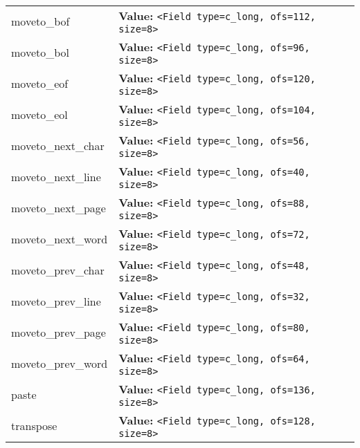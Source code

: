 \begin{longtable}{|p{\varnamewidth}|p{\vardescrwidth}|l}
\cline{1-2}
\raggedright m\-o\-v\-e\-t\-o\-\_\-b\-o\-f\- & \raggedright \textbf{Value:} 
{\tt {\textless}Field type=c\_long, ofs=112, size=8{\textgreater}}&\\
\cline{1-2}
\raggedright m\-o\-v\-e\-t\-o\-\_\-b\-o\-l\- & \raggedright \textbf{Value:} 
{\tt {\textless}Field type=c\_long, ofs=96, size=8{\textgreater}}&\\
\cline{1-2}
\raggedright m\-o\-v\-e\-t\-o\-\_\-e\-o\-f\- & \raggedright \textbf{Value:} 
{\tt {\textless}Field type=c\_long, ofs=120, size=8{\textgreater}}&\\
\cline{1-2}
\raggedright m\-o\-v\-e\-t\-o\-\_\-e\-o\-l\- & \raggedright \textbf{Value:} 
{\tt {\textless}Field type=c\_long, ofs=104, size=8{\textgreater}}&\\
\cline{1-2}
\raggedright m\-o\-v\-e\-t\-o\-\_\-n\-e\-x\-t\-\_\-c\-h\-a\-r\- & \raggedright \textbf{Value:} 
{\tt {\textless}Field type=c\_long, ofs=56, size=8{\textgreater}}&\\
\cline{1-2}
\raggedright m\-o\-v\-e\-t\-o\-\_\-n\-e\-x\-t\-\_\-l\-i\-n\-e\- & \raggedright \textbf{Value:} 
{\tt {\textless}Field type=c\_long, ofs=40, size=8{\textgreater}}&\\
\cline{1-2}
\raggedright m\-o\-v\-e\-t\-o\-\_\-n\-e\-x\-t\-\_\-p\-a\-g\-e\- & \raggedright \textbf{Value:} 
{\tt {\textless}Field type=c\_long, ofs=88, size=8{\textgreater}}&\\
\cline{1-2}
\raggedright m\-o\-v\-e\-t\-o\-\_\-n\-e\-x\-t\-\_\-w\-o\-r\-d\- & \raggedright \textbf{Value:} 
{\tt {\textless}Field type=c\_long, ofs=72, size=8{\textgreater}}&\\
\cline{1-2}
\raggedright m\-o\-v\-e\-t\-o\-\_\-p\-r\-e\-v\-\_\-c\-h\-a\-r\- & \raggedright \textbf{Value:} 
{\tt {\textless}Field type=c\_long, ofs=48, size=8{\textgreater}}&\\
\cline{1-2}
\raggedright m\-o\-v\-e\-t\-o\-\_\-p\-r\-e\-v\-\_\-l\-i\-n\-e\- & \raggedright \textbf{Value:} 
{\tt {\textless}Field type=c\_long, ofs=32, size=8{\textgreater}}&\\
\cline{1-2}
\raggedright m\-o\-v\-e\-t\-o\-\_\-p\-r\-e\-v\-\_\-p\-a\-g\-e\- & \raggedright \textbf{Value:} 
{\tt {\textless}Field type=c\_long, ofs=80, size=8{\textgreater}}&\\
\cline{1-2}
\raggedright m\-o\-v\-e\-t\-o\-\_\-p\-r\-e\-v\-\_\-w\-o\-r\-d\- & \raggedright \textbf{Value:} 
{\tt {\textless}Field type=c\_long, ofs=64, size=8{\textgreater}}&\\
\cline{1-2}
\raggedright p\-a\-s\-t\-e\- & \raggedright \textbf{Value:} 
{\tt {\textless}Field type=c\_long, ofs=136, size=8{\textgreater}}&\\
\cline{1-2}
\raggedright t\-r\-a\-n\-s\-p\-o\-s\-e\- & \raggedright \textbf{Value:} 
{\tt {\textless}Field type=c\_long, ofs=128, size=8{\textgreater}}&\\
\cline{1-2}
\end{longtable}

